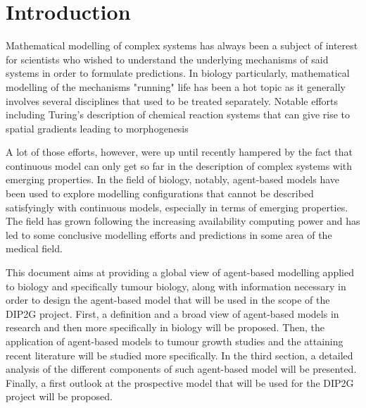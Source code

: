 \documentclass[11pt,a4paper]{article}
\begin{document}
\tableofcontents

\section{Introduction}
Mathematical modelling of complex systems has always been a subject of interest for scientists who wished to understand the underlying mechanisms of said systems in order to formulate predictions. In biology particularly, mathematical modelling of the mechanisms "running" life has been a hot topic as it generally involves several disciplines that used to be treated separately. Notable efforts including Turing's description of chemical reaction systems that can give rise to spatial gradients leading to morphogenesis %

A lot of those efforts, however, were up until recently hampered by the fact that continuous model can only get so far in the description of complex systems with emerging properties. In the field of biology, notably, agent-based models have been used to explore modelling configurations that cannot be described satisfyingly with continuous models, especially in terms of emerging properties. The field has grown following the increasing availability computing power and has led to some conclusive modelling efforts and predictions in some area of the medical field.  

This document aims at providing a global view of agent-based modelling applied to biology and specifically tumour biology, along with information necessary in order to design the agent-based model that will be used  in the scope of the DIP2G project. First, a definition and a broad view of agent-based models in research and then more specifically in biology will be proposed. Then, the application of agent-based models to tumour growth studies and the attaining recent literature will be studied more specifically. In the third section, a detailed analysis of the different components of such agent-based model will be presented. Finally, a first outlook at the prospective model that will be used for the DIP2G project will be proposed.
\end{document}
